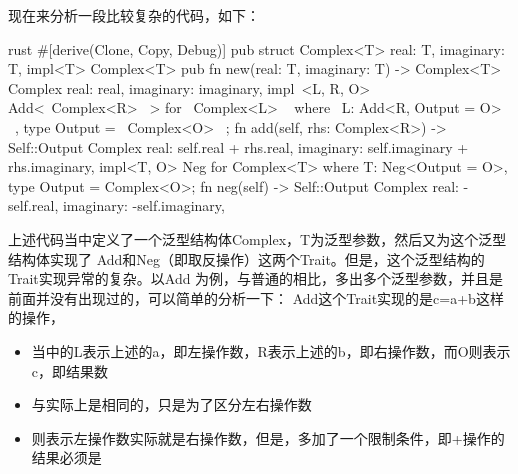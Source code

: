 现在来分析一段比较复杂的代码，如下：
\begin{code-block}[escapeinside=~~,mathescape]{rust}
#[derive(Clone, Copy, Debug)]
pub struct Complex<T> {
    real: T,
    imaginary: T,
}
impl<T> Complex<T> {
    pub fn new(real: T, imaginary: T) -> Complex<T> {
        Complex {
            real: real,
            imaginary: imaginary,
        }
    }
}
impl~\colorbox{WildStrawberry}{<L, R, O> }~ Add<~\colorbox{WildStrawberry}{Complex<R> }~> for ~\colorbox{WildStrawberry}{Complex<L> }~
where
    ~\colorbox{WildStrawberry}{L: Add<R, Output = O> }~,
{
    type Output = ~\colorbox{WildStrawberry}{Complex<O> }~;
    fn add(self, rhs: Complex<R>) -> Self::Output {
        Complex {
            real: self.real + rhs.real,
            imaginary: self.imaginary + rhs.imaginary,
        }
    }
}
impl<T, O> Neg for Complex<T>
where
    T: Neg<Output = O>,
{
    type Output = Complex<O>;
    fn neg(self) -> Self::Output {
        Complex {
            real: -self.real,
            imaginary: -self.imaginary,
        }
    }
}
\end{code-block}
上述代码当中定义了一个泛型结构体Complex，T为泛型参数，然后又为这个泛型结构体实现了
Add和Neg（即取反操作）这两个Trait。但是，这个泛型结构的Trait实现异常的复杂。以Add
为例，与普通的相比，多出多个泛型参数，并且是前面并没有出现过的，可以简单的分析一下：
Add这个Trait实现的是c=a+b这样的操作，
\begin{itemize}
  \item {}当中的L表示上述的a，即左操作数，R表示上述的b，即右操作数，而O则表示c，即结果数
  \item {}与实际上是相同的，只是为了区分左右操作数
  \item {}则表示左操作数实际就是右操作数，但是，多加了一个限制条件，即+操作的结果必须是
\end{itemize}

